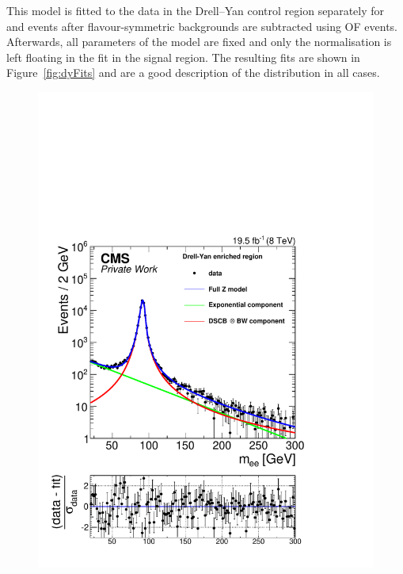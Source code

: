 This model is fitted to the data in the Drell--Yan control region separately for \EE and \MM events after flavour-symmetric backgrounds are subtracted using OF events. Afterwards, all parameters of the model are fixed and only the normalisation is left floating in the fit in the signal region. The resulting fits are shown in Figure~\ref{fig:dyFits} and are a good description of the distribution in all cases. 

\begin{figure}[htbp]
\centering
\begin{minipage}[t]{0.49\textwidth}
  \includegraphics[width=\textwidth]{plots/results/fit/expoFitEE_Log_Central.pdf}
\end{minipage}
\begin{minipage}[t]{0.49\textwidth}

\end{minipage}
\end{figure}
